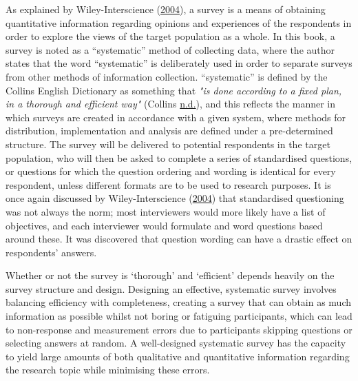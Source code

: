 \documentclass[
  11pt,
]{book}
\begin{document}
As explained by Wiley-Interscience
(\protect\hyperlink{ref-wiley2004}{2004}), a survey is a means of
obtaining quantitative information regarding opinions and experiences of
the respondents in order to explore the views of the target population
as a whole. In this book, a survey is noted as a ``systematic'' method
of collecting data, where the author states that the word ``systematic''
is deliberately used in order to separate surveys from other methods of
information collection. ``systematic'' is defined by the Collins English
Dictionary as something that
\textit{"is done according to a fixed plan, in a thorough and efficient way"}
(Collins \protect\hyperlink{ref-collins-systematic}{n.d.}), and this
reflects the manner in which surveys are created in accordance with a
given system, where methods for distribution, implementation and
analysis are defined under a pre-determined structure. The survey will
be delivered to potential respondents in the target population, who will
then be asked to complete a series of standardised questions, or
questions for which the question ordering and wording is identical for
every respondent, unless different formats are to be used to research
purposes. It is once again discussed by Wiley-Interscience
(\protect\hyperlink{ref-wiley2004}{2004}) that standardised questioning
was not always the norm; most interviewers would more likely have a list
of objectives, and each interviewer would formulate and word questions
based around these. It was discovered that question wording can have a
drastic effect on respondents' answers.

Whether or not the survey is `thorough' and `efficient' depends heavily
on the survey structure and design. Designing an effective, systematic
survey involves balancing efficiency with completeness, creating a
survey that can obtain as much information as possible whilst not boring
or fatiguing participants, which can lead to non-response and
measurement errors due to participants skipping questions or selecting
answers at random. A well-designed systematic survey has the capacity to
yield large amounts of both qualitative and quantitative information
regarding the research topic while minimising these errors.
\end{document}
